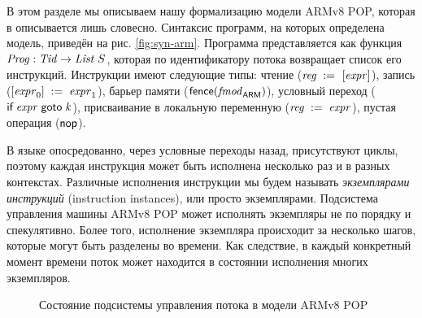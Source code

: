 В этом разделе мы описываем нашу формализацию модели ARMv8 POP, которая в \cite{Flur-al:POPL16}
описывается лишь словесно.
Синтаксис программ, на которых определена модель, приведён на рис. \ref{fig:syn-arm}.
Программа представляется как функция $\mathit{Prog} : \mathit{Tid} \rightarrow \mathit{List}\;{S}$, которая по
идентификатору потока возвращает список его инструкций.
Инструкции имеют следующие типы: чтение ($\mathit{reg} \;:=_{}\;[\mathit{expr}]$), запись ($[\mathit{expr}_0]\;:=\;\mathit{expr}_1$),
барьер памяти ($\mathsf{fence}({\mathit{fmod}_{\mathsf{ARM}}})$), условный переход ($\textsf{if} \; \mathit{expr} \; \textsf{goto} \; \mathit{k}$),
присваивание в локальную переменную ($\mathit{reg}\;:=\;\mathit{expr}$),
пустая операция ($\textsf{nop}$).

В языке опосредованно, через условные переходы назад, присутствуют циклы,
поэтому каждая инструкция может быть исполнена несколько раз и в разных контекстах.
Различные исполнения инструкции мы будем называть \emph{экземплярами инструкций} (instruction instances),
или просто экземплярами.
Подсистема управления машины ARMv8 POP может исполнять экземпляры не по порядку и спекулятивно.
Более того, исполнение экземпляра происходит за несколько шагов, которые могут быть разделены во времени.
Как следствие, в каждый конкретный момент времени поток может находится в состоянии исполнения многих экземпляров.

\newcommand{\tapeFont}{\small}
\begin{figure}
\begin{center}
\end{center}
\caption{Состояние подсистемы управления потока в модели ARMv8 POP}
\label{fig:armvpop:dag}
\end{figure}

